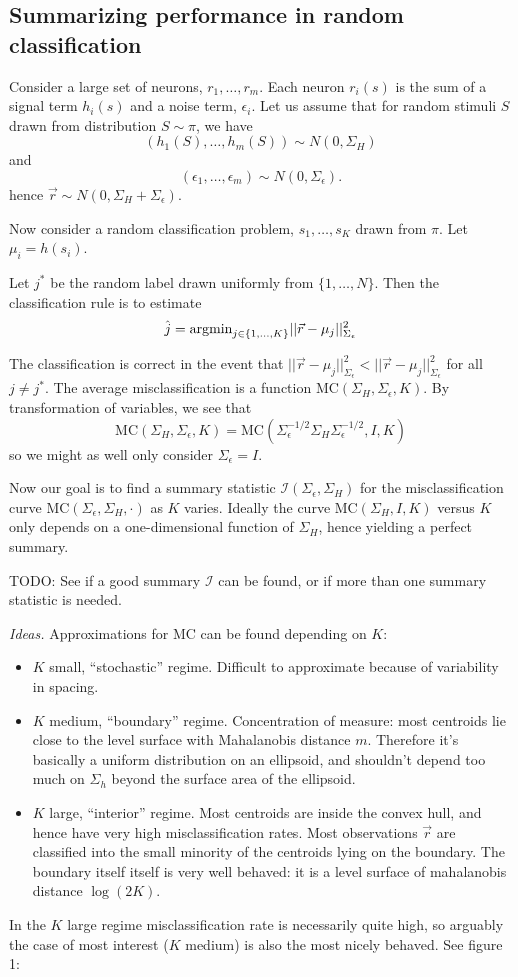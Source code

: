 \documentclass[12pt]{article}
\begin{document}
\subsection{Summarizing performance in random classification}

Consider a large set of neurons, $r_1,\hdots, r_m$.  Each neuron
$r_i(s)$ is the sum of a signal term $h_i(s)$ and a noise term,
$\epsilon_i$.  Let us assume that for random stimuli $S$ drawn from
distribution $S \sim \pi$, we have
\[
(h_1(S),\hdots, h_m(S)) \sim N(0, \Sigma_H)
\]
and
\[
(\epsilon_1,\hdots, \epsilon_m) \sim N(0, \Sigma_\epsilon).
\]
hence $\vec{r} \sim N(0, \Sigma_H + \Sigma_\epsilon).$

Now consider a random classification problem, $s_1,\hdots, s_K$ drawn
from $\pi$.  Let $\mu_i = h(s_i)$.

Let $j^*$ be the random label drawn uniformly from $\{1,\hdots,
N\}$. Then the classification rule is to estimate
\[
\hat{j} = \text{argmin}_{j \in \{1, \hdots, K\}} ||\vec{r} - \mu_j||^2_{\Sigma_\epsilon}
\]

The classification is correct in the event that $||\vec{r}
- \mu_j||_{\Sigma_\epsilon}^2 < ||\vec{r}
- \mu_j||_{\Sigma_\epsilon}^2$ for all $j \neq j^*$.  The average
misclassification is a function $\text{MC}(\Sigma_H, \Sigma_\epsilon,
K)$.  By transformation of variables, we see that
\[
\text{MC}(\Sigma_H, \Sigma_\epsilon, K) = \text{MC}(\Sigma_\epsilon^{-1/2}\Sigma_H\Sigma_\epsilon^{-1/2}, I, K)
\]
so we might as well only consider $\Sigma_\epsilon = I$.

Now our goal is to find a summary statistic
$\mathcal{I}(\Sigma_\epsilon, \Sigma_H)$ for the misclassification
curve $\text{MC}(\Sigma_\epsilon, \Sigma_H, \cdot)$ as $K$ varies.
Ideally the curve $\text{MC}(\Sigma_H, I, K)$ versus $K$ only depends
on a one-dimensional function of $\Sigma_H$, hence yielding a perfect
summary.

TODO: See if a good summary $\mathcal{I}$ can be found, or if more
than one summary statistic is needed.

\emph{Ideas.}
Approximations for $\text{MC}$ can be found depending on $K$:
\begin{itemize}
\item $K$ small, ``stochastic'' regime.  Difficult to approximate because of variability in spacing.
\item $K$ medium, ``boundary'' regime.  Concentration of measure: most centroids lie close to the level surface with Mahalanobis distance $m$.  Therefore it's basically a uniform distribution on an ellipsoid, and shouldn't depend too much on $\Sigma_h$ beyond the surface area of the ellipsoid.
\item $K$ large, ``interior'' regime.  Most centroids are inside the convex hull, and hence have very high misclassification rates.  Most observations $\vec{r}$ are classified into the small minority of the centroids lying on the boundary.  The boundary itself itself is very well behaved: it is a level surface of mahalanobis distance $\log(2K)$.  
\end{itemize}
In the $K$ large regime misclassification rate is necessarily quite high, so arguably the case of most interest ($K$ medium) is also the most nicely behaved.  See figure 1:
\end{document}
